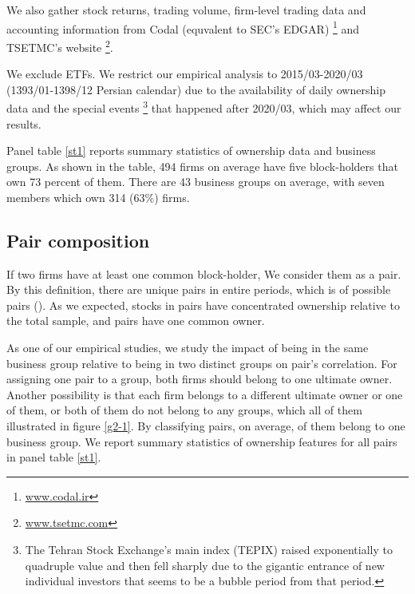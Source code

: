 	We also gather stock returns, trading volume, firm-level trading data and accounting information from Codal (equvalent to SEC's EDGAR) \footnote{\href{http://www.codal.ir}{www.codal.ir}}
and TSETMC's website \footnote{\href{http://www.tsetmc.com}{www.tsetmc.com}}.

We exclude ETFs. 
We restrict our empirical analysis to 2015/03-2020/03 (1393/01-1398/12 Persian calendar) due to the availability of daily ownership data and the special events \footnote{
	The Tehran Stock Exchange's main index (TEPIX) raised exponentially to quadruple value and then fell sharply due to the gigantic entrance of new individual investors that seems to be a bubble period from that period.} that happened after 2020/03, which may affect our results. 



Panel  table \ref{st1} reports summary statistics of ownership data and business groups. As shown in the table, 494 firms on average have five block-holders that own 73 percent of them. There are 43 business groups on average, with seven members which own 314 (63\%) firms. 






\subsection{{Pair composition} }

	If two firms have at least one common block-holder, We consider them as a pair. By this definition, there are   unique pairs in entire periods, which is of possible pairs (). As we expected, stocks in pairs have concentrated ownership relative to the total sample, and pairs have one common owner.
	
	\normalcolor
	
	As one of our empirical studies, we study the impact of being in the same business group relative to being in two distinct groups on pair's correlation. 
	For assigning one pair to a group, both firms should belong to one ultimate owner. Another possibility is that each firm belongs to a different ultimate owner or one of them, or both of them do not belong to any groups, which all of them illustrated in figure \ref{g2-1}.
	By classifying pairs, on average, of them  belong to one business group. We report summary statistics of ownership features for all pairs in panel  table \ref{st1}.
	
